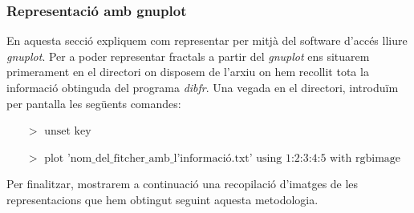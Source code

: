 \documentclass[12pt]{report}
\begin{document}
\subsubsection{Representació amb gnuplot}
En aquesta secció expliquem com representar per mitjà del software d'accés lliure \textit{gnuplot}.
\newline
Per a poder representar fractals a partir del \textit{gnuplot} ens situarem primerament en el directori on disposem de l'arxiu on hem recollit tota la informació obtinguda del programa \textit{dibfr}.
\newline
Una vegada en el directori, introduïm per pantalla les següents comandes:
\begin{itemize}
    \item [$>$] $\text{unset key}$
    \item [$>$] $\text{plot 'nom\_del\_fitcher\_amb\_l'informació.txt' using 1:2:3:4:5 with rgbimage}$
\end{itemize}
Per finalitzar, mostrarem a continuació una recopilació d'imatges de les representacions que hem obtingut seguint aquesta metodologia.
\newpage
\end{document}
